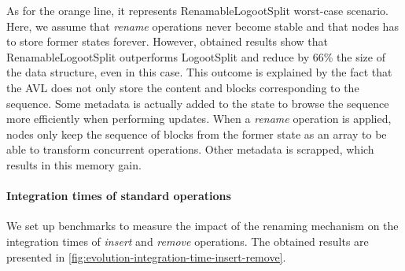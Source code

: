 \documentclass[sigplan,10pt]{acmart}
\begin{document}
As for the orange line, it represents RenamableLogootSplit worst-case scenario.
Here, we assume that \emph{rename} operations never become stable and that nodes has to store former states forever.
However, obtained results show that RenamableLogootSplit outperforms LogootSplit and reduce by 66\% the size of the data structure, even in this case.
This outcome is explained by the fact that the AVL does not only store the content and blocks corresponding to the sequence.
Some metadata is actually added to the state to browse the sequence more efficiently when performing updates.
When a \emph{rename} operation is applied, nodes only keep the sequence of blocks from the former state as an array to be able to transform concurrent operations.
Other metadata is scrapped, which results in this memory gain.

\paragraph{Integration times of standard operations}

We set up benchmarks to measure the impact of the renaming mechanism on the integration times of \emph{insert} and \emph{remove} operations.
The obtained results are presented in \autoref{fig:evolution-integration-time-insert-remove}.
\end{document}
